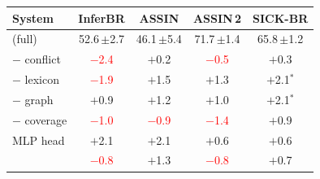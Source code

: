 \begin{tabular*}{\textwidth}{@{\extracolsep{\fill}}lcccc@{}}
\toprule
System & InferBR & ASSIN & ASSIN\,2 & SICK-BR \\
\midrule
\model{} (full) & 52.6\,{\tiny$\pm$2.7} & 46.1\,{\tiny$\pm$5.4} & 71.7\,{\tiny$\pm$1.4} & 65.8\,{\tiny$\pm$1.2} \\
$-$ conflict & \textcolor{red}{$-$2.4} & $+$0.2 & \textcolor{red}{$-$0.5} & $+$0.3 \\
$-$ lexicon & \textcolor{red}{$-$1.9} & $+$1.5 & $+$1.3 & $+$2.1$^{*}$ \\
$-$ graph & $+$0.9 & $+$1.2 & $+$1.0 & $+$2.1$^{*}$ \\
$-$ coverage & \textcolor{red}{$-$1.0} & \textcolor{red}{$-$0.9} & \textcolor{red}{$-$1.4} & $+$0.9 \\
MLP head & $+$2.1 & $+$2.1 & $+$0.6 & $+$0.6 \\
\midrule
\cls{} & \textcolor{red}{$-$0.8} & $+$1.3 & \textcolor{red}{$-$0.8} & $+$0.7 \\
\bottomrule
\end{tabular*}
